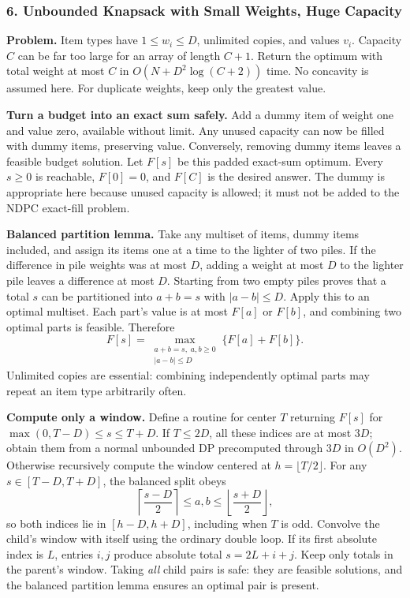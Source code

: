 \subsubsection{6. Unbounded Knapsack with Small Weights, Huge Capacity}
\textbf{Problem.} Item types have $1\le w_i\le D$, unlimited copies,
and values $v_i$. Capacity $C$ can be far too large for an array of
length $C+1$. Return the optimum with total weight at most $C$ in
$O(N+D^2\log(C+2))$ time. No concavity is assumed here.
For duplicate weights, keep only the greatest value.

\textbf{Turn a budget into an exact sum safely.} Add a dummy item
of weight one and value zero, available without limit. Any unused
capacity can now be filled with dummy items, preserving value.
Conversely, removing dummy items leaves a feasible budget solution.
Let $F[s]$ be this padded exact-sum optimum. Every $s\ge0$ is
reachable, $F[0]=0$, and $F[C]$ is the desired answer.
The dummy is appropriate here because unused capacity is allowed;
it must not be added to the NDPC exact-fill problem.

\textbf{Balanced partition lemma.} Take any multiset of items, dummy
items included, and assign its items one at a time to the lighter
of two piles. If the difference in pile weights was at most $D$,
adding a weight at most $D$ to the lighter pile leaves a difference
at most $D$. Starting from two empty piles proves that a total $s$
can be partitioned into $a+b=s$ with $|a-b|\le D$.
Apply this to an optimal multiset. Each part's value is at most
$F[a]$ or $F[b]$, and combining two optimal parts is feasible.
Therefore
\[
 F[s]=\max_{\substack{a+b=s,\;a,b\ge0\\|a-b|\le D}}
                    \{F[a]+F[b]\}.
\]
Unlimited copies are essential: combining independently optimal
parts may repeat an item type arbitrarily often.

\textbf{Compute only a window.} Define a routine for center $T$
returning $F[s]$ for $\max(0,T-D)\le s\le T+D$.
If $T\le2D$, all these indices are at most $3D$; obtain them from
a normal unbounded DP precomputed through $3D$ in $O(D^2)$.
Otherwise recursively compute the window centered at
$h=\lfloor T/2\rfloor$. For any $s\in[T-D,T+D]$, the balanced
split obeys
\[
 \left\lceil\frac{s-D}{2}\right\rceil\le a,b\le
 \left\lfloor\frac{s+D}{2}\right\rfloor,
\]
so both indices lie in $[h-D,h+D]$, including when $T$ is odd.
Convolve the child's window with itself using the ordinary double
loop. If its first absolute index is $L$, entries $i,j$ produce
absolute total $s=2L+i+j$. Keep only totals in the parent's window.
Taking \emph{all} child pairs is safe: they are feasible solutions,
and the balanced partition lemma ensures an optimal pair is present.

